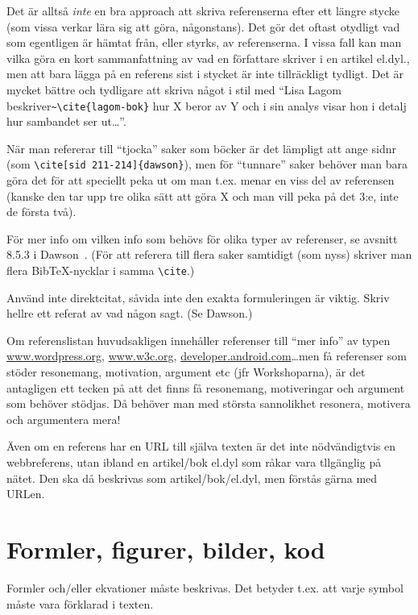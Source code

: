 \documentclass[swedish, a4paper,12pt]{article}
\begin{document}
Det är alltså \emph{inte} en bra approach att skriva referenserna efter ett längre stycke (som vissa verkar lära sig att göra, någonstans). Det gör det oftast otydligt vad som egentligen är hämtat från, eller styrks, av referenserna. I vissa fall kan man vilka göra en kort sammanfattning av vad en författare skriver i en artikel el.dyl., men att bara lägga på en referens sist i stycket är inte tillräckligt tydligt. Det är mycket bättre och tydligare att skriva något i stil med ``Lisa Lagom beskriver\verb|~\cite{lagom-bok}| hur X beror av Y och i sin analys visar hon i detalj hur sambandet ser ut\ldots''.

När man refererar till ``tjocka'' saker som böcker är det lämpligt att ange sidnr
(som \verb|\cite[sid 211-214]{dawson}|), men för ``tunnare'' saker behöver man bara göra det för att speciellt peka ut om man t.ex. menar en viss del av referensen (kanske den tar upp tre olika sätt att göra X och man vill peka på det 3:e, inte de första två).

För mer info om vilken info som behövs för olika typer av referenser, se avsnitt 8.5.3 i Dawson~\cite{dawson:projects-in-computing,dawson:projects-in-computing-old}. (För att referera till flera saker samtidigt (som nyss) skriver man flera BibTeX-nycklar i samma \verb|\cite|.)

Använd inte direktcitat, såvida inte den exakta formuleringen är viktig.  Skriv hellre ett referat av vad någon sagt. (Se Dawson.)

Om referenslistan huvudsakligen innehåller referenser till ``mer info'' av typen
\url{www.wordpress.org}, \url{www.w3c.org}, \url{developer.android.com}\ldots men få referenser som stöder resonemang, motivation, argument etc (jfr Workshoparna), är det antagligen ett tecken på att det finns få resonemang, motiveringar och argument som behöver stödjas. Då behöver man med största sannolikhet resonera, motivera och argumentera mera!

Även om en referens har en URL till själva texten är det inte nödvändigtvis en webbreferens, utan ibland en artikel/bok el.dyl som råkar vara tllgänglig på nätet. Den ska då beskrivas som artikel/bok/el.dyl, men förstås gärna med URLen.

\section{Formler, figurer, bilder, kod}
\label{sec:forml-figur-bild}

Formler och/eller ekvationer måste beskrivas.  Det betyder t.ex. att varje symbol måste vara förklarad i texten.
\end{document}
